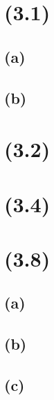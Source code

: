 \documentclass[paper=a4, fontsize=11pt]{scrartcl} %
\begin{document}
\section{ (3.1) }
    
\subsection{ (a) }

\subsection{ (b) }

\section{ (3.2) }
\section{ (3.4) }
\section{ (3.8) }
\subsection{ (a) }
\subsection{ (b) }
\subsection{ (c) }
\end{document}
